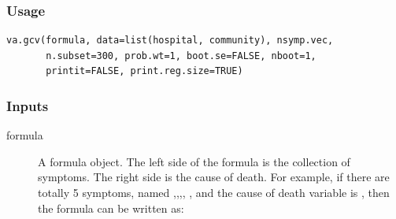 \documentclass[oneside,letterpaper,titlepage]{article}
\begin{document}
\subsubsection{Usage}

\begin{verbatim}
va.gcv(formula, data=list(hospital, community), nsymp.vec, 
       n.subset=300, prob.wt=1, boot.se=FALSE, nboot=1, 
       printit=FALSE, print.reg.size=TRUE)
\end{verbatim}

\subsubsection{Inputs}

\begin{description}
\item[formula] A formula object. The left side of the formula is the
  collection of symptoms. The right side is the cause of death.  For
  example, if there are totally 5 symptoms, named
  ,,,,
  , and the cause of death variable is
  , then the formula can be written as:


\end{description}
\end{document}
